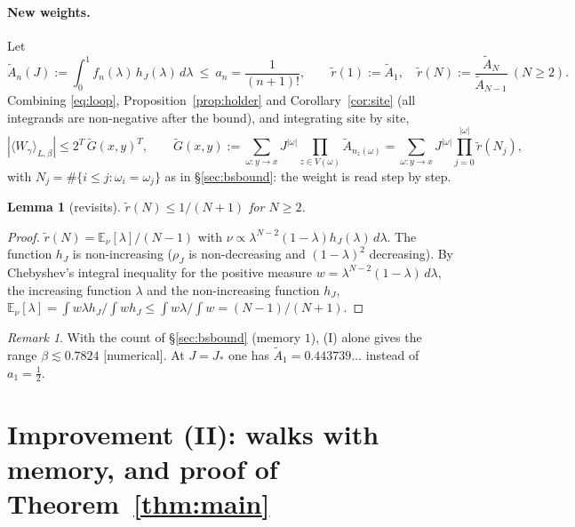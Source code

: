 \documentclass[11pt,a4paper]{article}
\theoremstyle{plain}
\newtheorem{lemma}[theorem]{Lemma}
\theoremstyle{remark}
\newtheorem{remark}[theorem]{Remark}
\numberwithin{equation}{section}
\newcommand{\E}{\mathbb{E}}
\newcommand{\At}{\widetilde A}
\newcommand{\rt}{\widetilde r}
\newcommand{\Gt}{\widetilde G}
\newcommand{\st}[1]{\textsf{[#1]}}
\begin{document}
\paragraph{New weights.} Let
\begin{equation}\label{eq:At}
\At_n(J):=\int_0^1f_n(\lambda)\,h_J(\lambda)\,d\lambda\ \le\ a_n=\frac1{(n+1)!},\qquad \rt(1):=\At_1,\quad \rt(N):=\frac{\At_N}{\At_{N-1}}\
(N\ge2).
\end{equation}
Combining \eqref{eq:loop}, Proposition~\ref{prop:holder} and Corollary~\ref{cor:site} (all integrands are non-negative after the
bound), and integrating site by site,
\begin{equation}\label{eq:Gt}
|\langle W_\gamma\rangle_{L,\beta}|\le2^T\,\Gt(x,y)^T,\qquad \Gt(x,y):=\sum_{\omega:y\to x}J^{|\omega|}\prod_{z\in V(\omega)}
\At_{n_z(\omega)}=\sum_{\omega:y\to x}J^{|\omega|}\prod_{j=0}^{|\omega|}\rt(N_j),
\end{equation}
with $N_j=\#\{i\le j:\omega_i=\omega_j\}$ as in \S\ref{sec:bsbound}: the weight is read step by step.

\begin{lemma}[revisits]\label{lem:revisit}
$\rt(N)\le1/(N+1)$ for $N\ge2$.
\end{lemma}
\begin{proof}
$\rt(N)=\E_\nu[\lambda]/(N-1)$ with $\nu\propto\lambda^{N-2}(1-\lambda)h_J(\lambda)\,d\lambda$. The function $h_J$ is non-increasing
($\rho_J$ is non-decreasing and $(1-\lambda)^2$ decreasing). By Chebyshev's integral inequality for the positive measure
$w=\lambda^{N-2}(1-\lambda)\,d\lambda$, the increasing function $\lambda$ and the non-increasing function $h_J$,
$\E_\nu[\lambda]=\int w\lambda h_J/\int wh_J\le\int w\lambda/\int w=(N-1)/(N+1)$.
\end{proof}

\begin{remark}
With the count of \S\ref{sec:bsbound} (memory $1$), (I) alone gives the range $\beta\lesssim0.7824$ \st{numerical}. At $J=J_*$ one
has $\At_1=0.443739\ldots$ instead of $a_1=\frac12$.
\end{remark}

\section{Improvement (II): walks with memory, and proof of Theorem~\ref{thm:main}}\label{sec:II}
\end{document}
